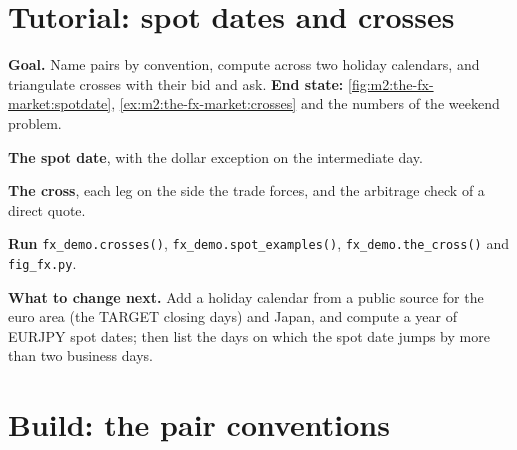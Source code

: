 \section{Tutorial: spot dates and crosses}\label{tut:m2:the-fx-market:pairs}

\begin{tutorial}
\textbf{Goal.} Name pairs by convention, compute  across two
holiday calendars, and triangulate crosses with their bid and ask.
\textbf{End state:} \cref{fig:m2:the-fx-market:spotdate},
\cref{ex:m2:the-fx-market:crosses} and the numbers of the weekend problem.
\begin{tutsteps}
\item \textbf{The spot date}, with the dollar exception on the intermediate
day.
\label{lst:m2:the-fx-market:spot}
\item \textbf{The cross}, each leg on the side the trade forces, and the
arbitrage check of a direct quote.
\label{lst:m2:the-fx-market:cross}
\item \textbf{Run} \texttt{fx\_demo.crosses()}, \texttt{fx\_demo.spot\_examples()},
\texttt{fx\_demo.the\_cross()} and \texttt{fig\_fx.py}.
\end{tutsteps}
\textbf{What to change next.} Add a holiday calendar from a public source for
the euro area (the TARGET closing days) and Japan, and compute a year of EURJPY
spot dates; then list the days on which the spot date jumps by more than two
business days.
\end{tutorial}

\section{Build: the pair conventions}\label{bld:m2:the-fx-market:fxpairs}

